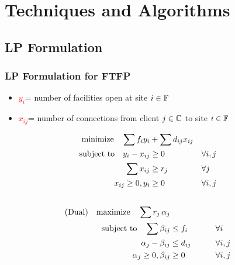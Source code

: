 \documentclass[hyperref,dvipsnames,svgnames,compress]{beamer}
\begin{document}

\section[Techniques]{Techniques and Algorithms}
\subsection[LP]{LP Formulation}
\begin{frame}
  \frametitle{LP Formulation for FTFP}
  \begin{itemize}
  \item \textcolor{red}{$y_i$}=   number of facilities open at site $i\in \mathbb{F}$
  \item \textcolor{red}{$x_{ij}$}= number of connections from client $j\in
    \mathbb{C}$ to site $i \in \mathbb{F}$
  \end{itemize}
  \begin{alignat}{3}
    \textrm{minimize}\quad \sum f_iy_i &+ \sum d_{ij}x_{ij}&
    \\ \notag
    \textrm{subject to}\quad y_i - x_{ij} &\geq 0  & &\forall i,j
    \\ \notag
    \sum x_{ij} &\geq r_j & &\forall j
    \\ \notag
    x_{ij} \geq 0, y_i &\geq 0 & &\forall i,j
    \\ \notag
  \end{alignat}
  \begin{alignat}{3}
  \text{(Dual)}\quad  \textrm{maximize}\quad \sum r_j\, \alpha_j&
    \\ \notag
    \textrm{subject to} \quad 
      \sum \beta_{ij} &\leq f_i  &\quad\quad			&\forall i
    \\ \notag
    \alpha_{j} - \beta_{ij} 	&\leq  d_{ij}       &                 & \forall i,j
    \\ \notag
    \alpha_j \geq 0, \beta_{ij} &\geq 0           &            & \forall i,j
  \end{alignat}
\end{frame}
\end{document}

